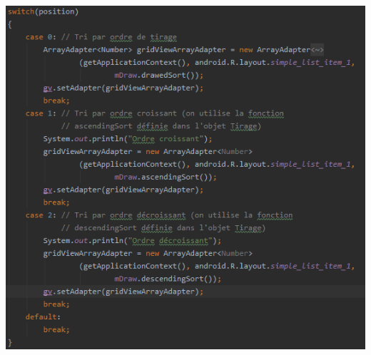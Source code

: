 \documentclass{article}
\begin{document}
\begin{center} \includegraphics[scale=0.8]{switch_DrawListActivity.png} \end{center}

\newpage
\end{document}

